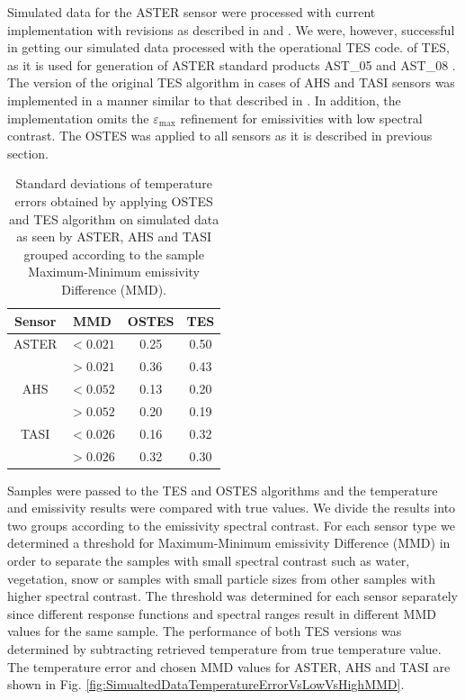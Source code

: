 Simulated data for the ASTER sensor were processed with current implementation with revisions as described in \cite{GG06} and \cite{SG09}. We were, however, successful in getting our simulated data processed with the operational TES code. of TES, as it is used for generation of ASTER standard products AST\_05 and AST\_08 \cite{B15}. The version of the original TES algorithm in cases of AHS and TASI sensors was implemented in a manner similar to that described in \cite{JS12}. In addition, the implementation omits the $\varepsilon_\mathrm{max}$ refinement for emissivities with low spectral contrast. The OSTES was applied to all sensors as it is described in previous section.

\begin{table}[thb]
\vspace{0.5em}
\footnotesize
\centering
\begin{tabular}{cccc}
\toprule
Sensor & MMD & OSTES & TES \\ \hline
ASTER 	& $< 0.021$ & 0.25 & 0.50 \\
 		& $> 0.021$ & 0.36 & 0.43 \\ \hline
AHS 		& $< 0.052$ & 0.13 & 0.20 \\
 		& $> 0.052$ & 0.20 & 0.19 \\ \hline
TASI 	& $< 0.026$ & 0.16 & 0.32 \\
 		& $> 0.026$ & 0.32 & 0.30 \\
\bottomrule
\end{tabular}
\vspace{1.5 em}
\caption{Standard deviations of temperature errors obtained by applying OSTES and TES algorithm on simulated data as seen by ASTER, AHS and TASI grouped according to the sample Maximum-Minimum emissivity Difference (MMD). }
\label{table:StandardDeviations}
\normalsize
\end{table}

Samples were passed to the TES and OSTES algorithms and the temperature and emissivity results were compared with true values. We divide the results into two groups according to the emissivity spectral contrast. For each sensor type we determined a threshold for Maximum-Minimum emissivity Difference (MMD) in order to separate the samples with small spectral contrast such as water, vegetation, snow or samples with small particle sizes from other samples with higher spectral contrast. The threshold was determined for each sensor separately since different response functions and spectral ranges result in different MMD values for the same sample. The performance of both TES versions was determined by subtracting retrieved temperature from true temperature value. The temperature error and chosen MMD values for ASTER, AHS and TASI are shown in Fig. \ref{fig:SimualtedDataTemperatureErrorVsLowVsHighMMD}.


